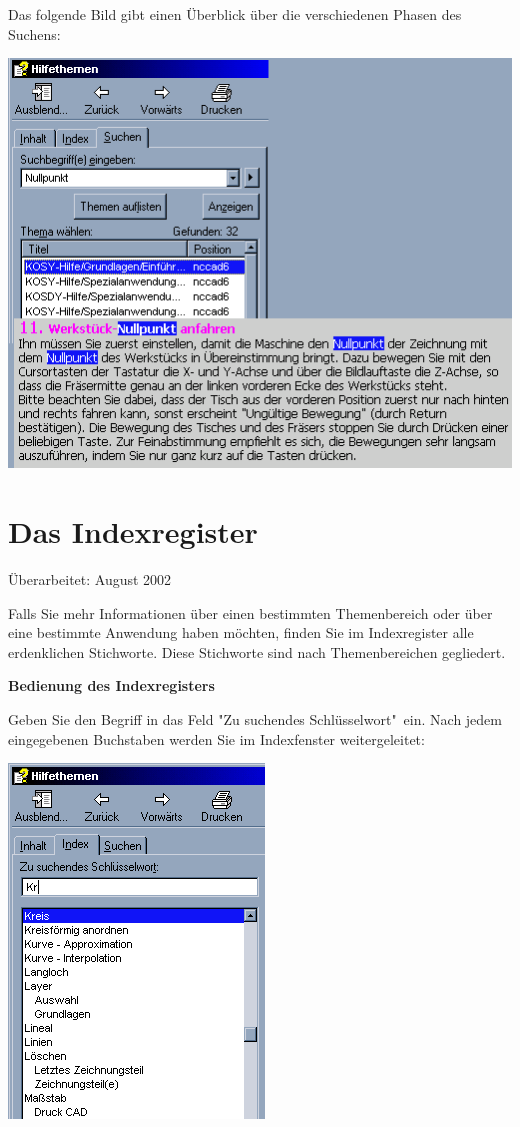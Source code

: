 \documentclass[a4paper]{book}
\begin{document}
\bigskip

Das folgende Bild gibt einen Überblick über die verschiedenen Phasen des Suchens:

\includegraphics{pic/Suche1.png}

\chapter{Das Indexregister} 

Überarbeitet: August 2002

\bigskip

Falls Sie mehr Informationen über einen bestimmten Themenbereich oder über eine bestimmte 
Anwendung haben möchten, finden Sie im Indexregister alle erdenklichen Stichworte. Diese 
Stichworte sind nach Themenbereichen gegliedert.

\bigskip

\textbf{Bedienung des Indexregisters}

\bigskip

Geben Sie den Begriff in das Feld "Zu suchendes Schlüsselwort"\ ein. 
Nach jedem
eingegebenen Buchstaben werden Sie im Indexfenster weitergeleitet:

\includegraphics{pic/Suche2.png}
\end{document}
